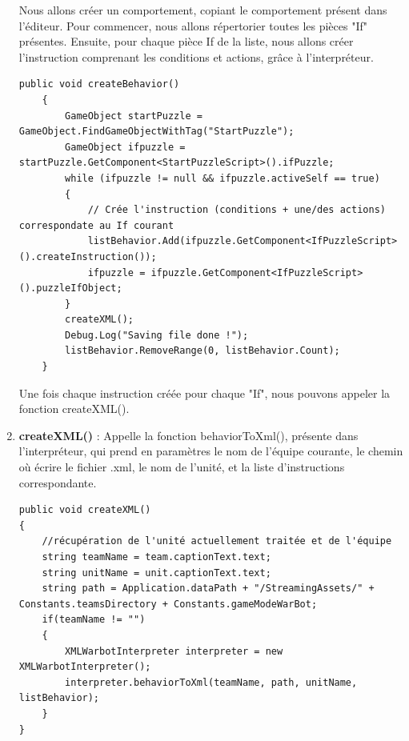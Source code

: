 \documentclass{report}
\begin{document}
\begin{enumerate}[label=\Alph*)]
Nous allons créer un comportement, copiant le comportement présent dans l'éditeur. Pour commencer, nous allons répertorier toutes les pièces "If" présentes. Ensuite, pour chaque pièce If de la liste, nous allons créer l'instruction comprenant les conditions et actions, grâce à l'interpréteur.\newline
\begin{lstlisting}[language={[Sharp]C},label={lst:createBehavior()}, caption= Extrait du code de SaveFile.cs]
public void createBehavior()
    {
        GameObject startPuzzle = GameObject.FindGameObjectWithTag("StartPuzzle");
        GameObject ifpuzzle = startPuzzle.GetComponent<StartPuzzleScript>().ifPuzzle;
        while (ifpuzzle != null && ifpuzzle.activeSelf == true)
        {
            // Crée l'instruction (conditions + une/des actions) correspondate au If courant
            listBehavior.Add(ifpuzzle.GetComponent<IfPuzzleScript>().createInstruction());
            ifpuzzle = ifpuzzle.GetComponent<IfPuzzleScript>().puzzleIfObject;
        }
        createXML();
        Debug.Log("Saving file done !");
        listBehavior.RemoveRange(0, listBehavior.Count);
    }
\end{lstlisting}
Une fois chaque instruction créée pour chaque "If", nous pouvons appeler la fonction createXML().\newline
\item\textbf{createXML()} :  \newline
Appelle la fonction behaviorToXml(), présente dans l'interpréteur, qui prend en paramètres le nom de l'équipe courante, le chemin où écrire le fichier .xml, le nom de l'unité, et la liste d'instructions correspondante.
\begin{lstlisting}[language={[Sharp]C},label={lst:createXML()}, caption= Extrait du code de SaveFile.cs]
public void createXML()
{
    //récupération de l'unité actuellement traitée et de l'équipe
    string teamName = team.captionText.text;
    string unitName = unit.captionText.text;
    string path = Application.dataPath + "/StreamingAssets/" + Constants.teamsDirectory + Constants.gameModeWarBot;
    if(teamName != "")
    {
        XMLWarbotInterpreter interpreter = new XMLWarbotInterpreter();
        interpreter.behaviorToXml(teamName, path, unitName, listBehavior);
    }        
}
\end{lstlisting}


\end{enumerate}
\end{document}
